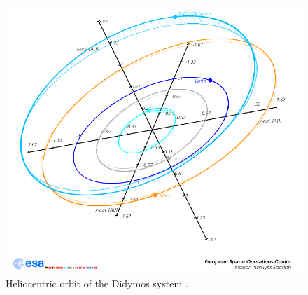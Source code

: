 \begin{figure}[h]
\centering
\captionsetup{justification=centering}
\includegraphics[scale=0.5]{aim.png}
\caption{Heliocentric orbit of the Didymos system \cite{aida}.}
\label{fig:aim}
\end{figure}
\FloatBarrier

